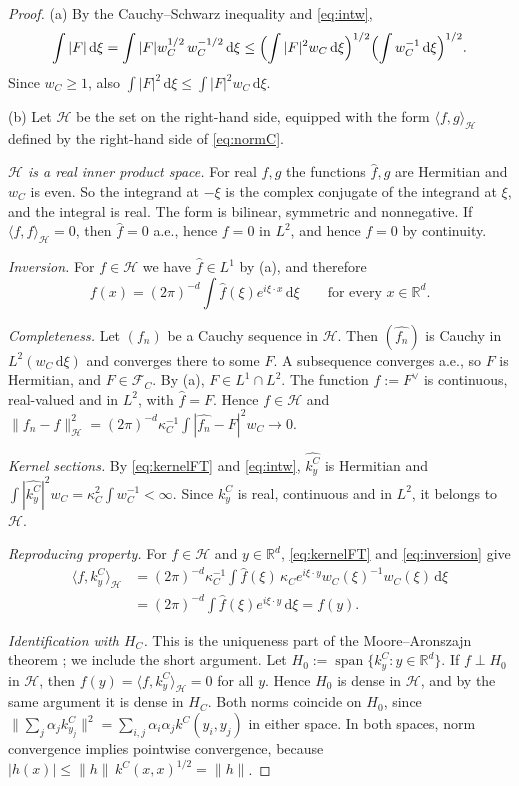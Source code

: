 \documentclass[11pt]{amsart}
\numberwithin{equation}{section}
\theoremstyle{definition}
\theoremstyle{remark}
\newcommand{\R}{\mathbb{R}}
\newcommand{\dd}{\,\mathrm{d}}
\newcommand{\FC}[1]{\mathcal{F}_{#1}}
\newcommand{\ip}[2]{\langle #1,#2\rangle}
\newcommand{\hatf}[1]{\widehat{#1}}
\begin{document}
\begin{proof}
(a) By the Cauchy--Schwarz inequality and \eqref{eq:intw},
\[
\int|F|\dd\xi=\int|F|w_C^{1/2}\,w_C^{-1/2}\dd\xi
\le\Bigl(\int|F|^2w_C\dd\xi\Bigr)^{1/2}\Bigl(\int w_C^{-1}\dd\xi\Bigr)^{1/2}.
\]
Since $w_C\ge1$, also $\int|F|^2\dd\xi\le\int|F|^2w_C\dd\xi$.

(b) Let $\mathcal H$ be the set on the right-hand side, equipped with the form $\ip fg_{\mathcal H}$ defined by the
right-hand side of \eqref{eq:normC}.

\emph{$\mathcal H$ is a real inner product space.} For real $f,g$ the functions $\hatf f,\hatf g$ are Hermitian and
$w_C$ is even. So the integrand at $-\xi$ is the complex conjugate of the integrand at $\xi$, and the integral is real.
The form is bilinear, symmetric and nonnegative. If $\ip ff_{\mathcal H}=0$, then $\hatf f=0$ a.e., hence $f=0$ in $L^2$,
and hence $f=0$ by continuity.

\emph{Inversion.} For $f\in\mathcal H$ we have $\hatf f\in L^1$ by (a), and therefore
\begin{equation}\label{eq:inversion}
f(x)=(2\pi)^{-d}\int\hatf f(\xi)e^{i\xi\cdot x}\dd\xi\qquad\text{for every }x\in\R^d .
\end{equation}

\emph{Completeness.} Let $(f_n)$ be a Cauchy sequence in $\mathcal H$. Then $(\hatf{f_n})$ is Cauchy in
$L^2(w_C\dd\xi)$ and converges there to some $F$. A subsequence converges a.e., so $F$ is Hermitian, and $F\in\FC{C}$.
By (a), $F\in L^1\cap L^2$. The function $f:=F^\vee$ is continuous, real-valued and in $L^2$, with $\hatf f=F$. Hence
$f\in\mathcal H$ and $\|f_n-f\|_{\mathcal H}^2=(2\pi)^{-d}\kappa_C^{-1}\int|\hatf{f_n}-F|^2w_C\to0$.

\emph{Kernel sections.} By \eqref{eq:kernelFT} and \eqref{eq:intw}, $\hatf{k^C_y}$ is Hermitian and
$\int|\hatf{k^C_y}|^2w_C=\kappa_C^2\int w_C^{-1}<\infty$. Since $k^C_y$ is real, continuous and in $L^2$, it
belongs to $\mathcal H$.

\emph{Reproducing property.} For $f\in\mathcal H$ and $y\in\R^d$, \eqref{eq:kernelFT} and \eqref{eq:inversion} give
\begin{align*}
\ip f{k^C_y}_{\mathcal H}
&=(2\pi)^{-d}\kappa_C^{-1}\int\hatf f(\xi)\,\kappa_C e^{i\xi\cdot y}w_C(\xi)^{-1}w_C(\xi)\dd\xi\\
&=(2\pi)^{-d}\int\hatf f(\xi)e^{i\xi\cdot y}\dd\xi=f(y).
\end{align*}

\emph{Identification with $H_C$.} This is the uniqueness part of the Moore--Aronszajn theorem
\cite{Aronszajn,PaulsenRaghupathi}; we include the short argument. Let $H_0:=\operatorname{span}\{k^C_y:y\in\R^d\}$. If
$f\perp H_0$ in $\mathcal H$, then $f(y)=\ip f{k^C_y}_{\mathcal H}=0$ for all $y$. Hence $H_0$ is dense in $\mathcal H$,
and by the same argument it is dense in $H_C$. Both norms coincide on $H_0$, since
$\|\sum_j\alpha_jk^C_{y_j}\|^2=\sum_{i,j}\alpha_i\alpha_jk^C(y_i,y_j)$ in either space. In both spaces, norm
convergence implies pointwise convergence, because $|h(x)|\le\|h\|\,k^C(x,x)^{1/2}=\|h\|$.


\end{proof}
\end{document}
